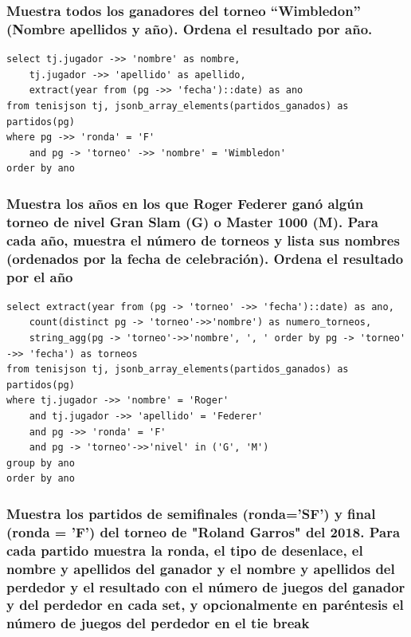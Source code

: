 \documentclass[11pt]{opticajnl}
\begin{document}
\subsubsection{Muestra todos los ganadores del torneo ``Wimbledon'' (Nombre apellidos y año). Ordena el resultado por año.}

\begin{verbatim}
select tj.jugador ->> 'nombre' as nombre, 
    tj.jugador ->> 'apellido' as apellido, 
    extract(year from (pg ->> 'fecha')::date) as ano
from tenisjson tj, jsonb_array_elements(partidos_ganados) as partidos(pg)
where pg ->> 'ronda' = 'F' 
    and pg -> 'torneo' ->> 'nombre' = 'Wimbledon'
order by ano
\end{verbatim}





\subsubsection{Muestra los años en los que Roger Federer ganó algún torneo de nivel Gran Slam (G) o Master 1000 (M). Para cada año, muestra el número de torneos y lista sus nombres (ordenados por la fecha de celebración). Ordena el resultado por el año}

\begin{verbatim}
select extract(year from (pg -> 'torneo' ->> 'fecha')::date) as ano,
    count(distinct pg -> 'torneo'->>'nombre') as numero_torneos,
    string_agg(pg -> 'torneo'->>'nombre', ', ' order by pg -> 'torneo' ->> 'fecha') as torneos
from tenisjson tj, jsonb_array_elements(partidos_ganados) as partidos(pg)
where tj.jugador ->> 'nombre' = 'Roger'
    and tj.jugador ->> 'apellido' = 'Federer'
    and pg ->> 'ronda' = 'F'
    and pg -> 'torneo'->>'nivel' in ('G', 'M')
group by ano
order by ano
\end{verbatim}





\subsubsection{Muestra los partidos de semiﬁnales (ronda='SF') y ﬁnal (ronda = 'F') del torneo de "Roland Garros" del 2018. Para cada partido muestra la ronda, el tipo de desenlace, el nombre y apellidos del ganador y el nombre y apellidos del perdedor y el resultado con el número de juegos del ganador y del perdedor en cada set, y opcionalmente en paréntesis el número de juegos del perdedor en el tie break}
\end{document}
